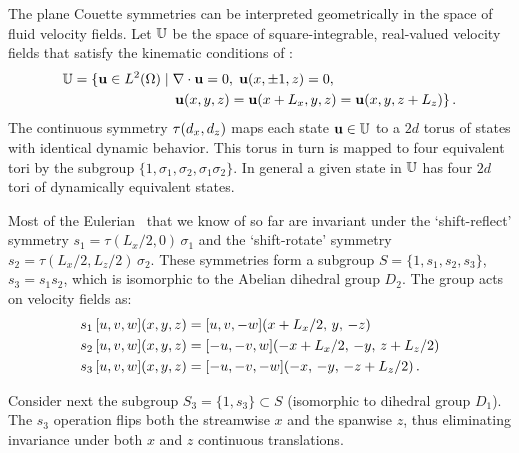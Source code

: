 \documentclass[letter,10pt,openany]{article}
\begin{document}
The plane Couette symmetries can be interpreted geometrically in the space of
fluid velocity fields. Let $\mathbb{U}$ be the space of
square-integrable, real-valued velocity fields that satisfy the kinematic
conditions of \pCf:
\begin{align}
 \bbU  &= \{\bu \in L^2(\Omega) \; | \; \grad \cdot \bu = 0,
               \; \bu(x, \pm 1, z) = 0, \notag  \\
         &\phantom{=} {} \qquad \qquad \qquad \; \; %
          \bu(x, y, z) = \bu(x+L_x, y, z) = \bu(x, y, z + L_z)\}  \,.
\end{align} 
The continuous symmetry $\tau(d_x, d_z)$ maps each state
${\bf u} \in \mathbb{U}$ to a $2d$ torus of states with identical dynamic
behavior. This torus in turn is mapped to four equivalent tori by
the subgroup $\{1,\sigma_1,\sigma_2, \sigma_1 \sigma_2\}$. In
general a given state in $\mathbb{U}$ has four $2d$ tori of dynamically
equivalent states.

Most of the Eulerian \eqva\ that we know of so far
are invariant under the `shift-reflect' symmetry
$s_1 = \tau(L_x/2,0) \, \sigma_1$ and the `shift-rotate' symmetry
$s_2 = \tau(L_x/2,L_z/2) \, \sigma_2$.  These symmetries form a subgroup
$S = \{1, s_1, s_2, s_3\}$, $s_3 = s_1 s_2$, which is isomorphic to
the Abelian dihedral group $D_2$. The group acts on velocity fields
as:
\begin{align}
s_1 \, [u, v, w](x,y,z) &= [u, v, -w](x+L_x/2,\, y,\, -z) \nonumber \\
s_2 \, [u, v, w](x,y,z) &= [-u, -v, w](-x+L_x/2,\,-y,\,z+L_z/2) \label{shiftRot} \\
s_3 \, [u, v, w](x,y,z) &= [-u,-v,-w](-x,\, -y,\, -z+L_z/2) \nonumber \,.
\end{align}

Consider next the subgroup $S_3 = \{1,s_3\} \subset S$ (isomorphic to
dihedral group $D_1$). The $s_3$ operation flips both the streamwise
$x$ and the spanwise $z$, thus eliminating invariance under both $x$
and $z$ continuous translations. 
\end{document}
